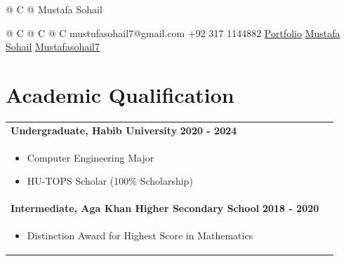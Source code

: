 \documentclass[a4paper,8pt]{article}
\begin{document}
\pagestyle{empty} 

\begin{tabularx}{\linewidth}{@{} C @{}}
\Huge{Mustafa Sohail} \\[6pt]
\end{tabularx}

\begin{tabularx}{\linewidth}{@{} C @{} C @{} C}
{{\raisebox{-0.05\height}{\faEnvelope} mustufasohail7@gmail.com}} 
{{\raisebox{-0.05\height}{\faMobile} +92 317 1144882}} 
{{\href{https://mustafasohail7.github.io}{\raisebox{-0.05\height}{\faGlobe} Portfolio}}}
{{\href{https://www.linkedin.com/in/mustafa-sohail-187ab4206/}{\raisebox{-0.05\height}{\faLinkedin} Mustafa Sohail}}}
{{\href{https://github.com/Mustafasohail7}{\raisebox{-0.05\height}{\faGithub} Mustafasohail7}}}
\end{tabularx}

\section{\textbf{Academic Qualification}}
\begin{tabularx}{\linewidth}{ @{}l r@{}}
\textbf{Undergraduate, Habib University} \hfill \textbf{2020 - 2024} \\[4pt]
\begin{minipage}[t]{\linewidth}
    \begin{itemize}[nosep, after=\strut, leftmargin=1em, itemsep=2pt]
        \item Computer Engineering Major
        \item HU-TOPS Scholar (100\% Scholarship)
    \end{itemize}
\end{minipage} \\[4pt]


\textbf{Intermediate, Aga Khan Higher Secondary School} \hfill \textbf{2018 - 2020}\\[4pt]
\begin{minipage}[t]{\linewidth}
    \begin{itemize}[nosep, after=\strut, leftmargin=1em, itemsep=2pt]
        \item Distinction Award for Highest Score in Mathematics
    \end{itemize}
\end{minipage}
\end{tabularx}

\end{document}
